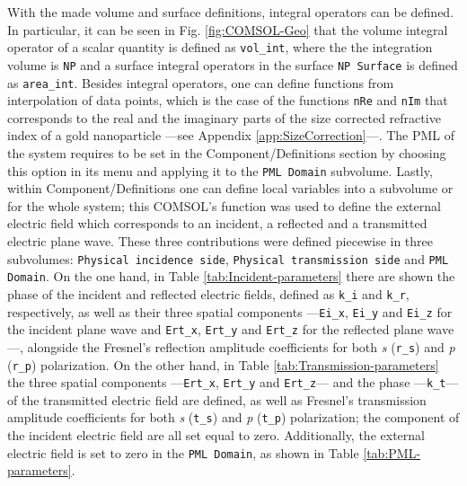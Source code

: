 With the made volume and surface definitions, integral operators can be defined. In particular, it can be seen in Fig. \ref{fig:COMSOL-Geo} that the volume integral operator of a scalar quantity is defined as \lstinline!vol_int!, where the the integration volume is \lstinline!NP! and a surface integral operators in the surface \lstinline!NP Surface! is defined as \lstinline!area_int!. Besides integral operators, one can define functions from interpolation of data points, which is the case of the functions \lstinline!nRe! and \lstinline!nIm! that corresponds to the real and the imaginary parts of the size corrected refractive index of a gold nanoparticle ---see Appendix \ref{app:SizeCorrection}---. The PML of the system requires to be set in the Component/Definitions section by choosing this option in its menu and applying it to the \lstinline!PML Domain! subvolume. Lastly, within Component/Definitions one can define local variables into a subvolume or for the whole system; this COMSOL's function was used to define the external electric field which corresponds to an incident, a reflected and a transmitted electric plane wave. These three contributions were defined piecewise in three subvolumes: \lstinline!Physical incidence side!, \lstinline!Physical transmission side! and \lstinline!PML Domain!. On the one hand, in Table \ref{tab:Incident-parameters} there are shown the phase of the incident and reflected electric fields, defined as \lstinline!k_i! and \lstinline!k_r!, respectively, as well as their three spatial components ---\lstinline!Ei_x!, \lstinline!Ei_y! and \lstinline!Ei_z! for the incident plane wave and \lstinline!Ert_x!, \lstinline!Ert_y! and \lstinline!Ert_z! for the reflected plane wave ---, alongside the Fresnel's reflection amplitude coefficients for both \textit{s} (\lstinline!r_s!) and \textit{p} (\lstinline!r_p!) polarization. On the other hand, in Table \ref{tab:Transmission-parameters} the three spatial components ---\lstinline!Ert_x!, \lstinline!Ert_y! and \lstinline!Ert_z!--- and the phase ---\lstinline!k_t!--- of the transmitted electric field are defined, as well as Fresnel's transmission amplitude coefficients for both \textit{s} (\lstinline!t_s!) and \textit{p} (\lstinline!t_p!) polarization; the component of the incident electric field are all set equal to zero. Additionally, the external electric field is set to zero in the \lstinline!PML Domain!, as shown in Table \ref{tab:PML-parameters}.

